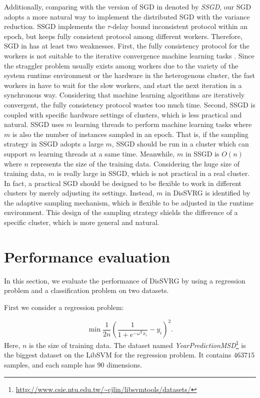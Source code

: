 \documentclass[preprint,review,11pt,a4paper]{elsarticle}
\begin{document}
Additionally, comparing with the version of SGD in \cite{Zhang:2015tp} denoted by \emph{SSGD}, our SGD adopts a more natural way to implement the distributed SGD with the variance reduction. SSGD implements the $\tau$-delay bound inconsistent protocol within an epoch, but keeps fully consistent protocol among different workers. Therefore, SGD in \cite{Zhang:2015tp} has at least two weaknesses. First, the fully consistency protocol for the workers is not suitable to the iterative convergence machine learning tasks \cite{2015_dai_high_performance_ml, Li:2014uy, Dai:2013vj}. Since the straggler problem usually exists among workers due to the variety of the system runtime environment or the hardware in the heterogenous cluster, the fast workers in \cite{Zhang:2015tp} have to wait for the slow workers, and start the next iteration in a synchronous way. Considering that machine learning algorithms are iteratively convergent, the fully consistency protocol wastes too much time. Second, SSGD is coupled with specific hardware settings of clusters, which is less practical and natural. SSGD uses $m$ learning threads to perform machine learning tasks where $m$ is also the number of instances sampled in an epoch. That is, if the sampling strategy in SSGD adopts a large $m$, SSGD should be run in a cluster which can support $m$ learning threads at a same time. Meanwhile, $m$ in SSGD is $O(n)$ where $n$ represents the size of the training data. Considering the huge size of training data, $m$ is really large in SSGD, which is not practical in a real cluster. In fact, a practical SGD should be designed to be flexible to work in different clusters by merely adjusting its settings. Instead, $m$ in DisSVRG is identified by the adaptive sampling mechanism, which is flexible to be adjusted in the runtime environment. This design of the sampling strategy shields the difference of a specific cluster, which is more general and natural.

\section{Performance evaluation}
\label{performance_evaluation}
In this section, we evaluate the performance of DisSVRG by using a regression problem and a classification problem on two datasets.

First we consider a regression problem:

\begin{equation}
\label{regression}
\min \frac{1}{2n}\left(\frac{1}{1+e^{-\omega^\mathrm{T}x_i}}-y_i\right)^2.
\end{equation}
Here, $n$ is the size of training data. The dataset named \emph{YearPredictionMSD}\footnote{\url{http://www.csie.ntu.edu.tw/~cjlin/libsvmtools/datasets/}} is the biggest dataset on the LibSVM for the regression problem. It contains $463715$ samples, and each sample has $90$ dimensions.
\end{document}
